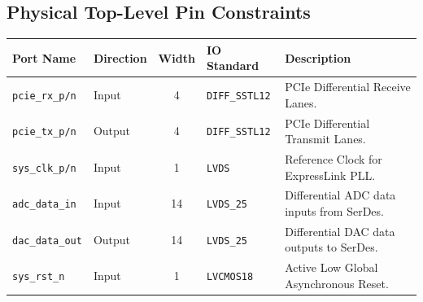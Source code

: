 \subsection{Physical Top-Level Pin Constraints}
\noindent
\begin{tabularx}{\textwidth}{l l c l X}
\toprule
\textbf{Port Name} & \textbf{Direction} & \textbf{Width} & \textbf{IO Standard} & \textbf{Description} \\
\midrule
\texttt{pcie\_rx\_p/n} & Input & 4 & \texttt{DIFF\_SSTL12} & PCIe Differential Receive Lanes. \\
\texttt{pcie\_tx\_p/n} & Output & 4 & \texttt{DIFF\_SSTL12} & PCIe Differential Transmit Lanes. \\
\texttt{sys\_clk\_p/n} & Input & 1 & \texttt{LVDS} & Reference Clock for ExpressLink PLL. \\
\texttt{adc\_data\_in} & Input & 14 & \texttt{LVDS\_25} & Differential ADC data inputs from SerDes. \\
\texttt{dac\_data\_out} & Output & 14 & \texttt{LVDS\_25} & Differential DAC data outputs to SerDes. \\
\texttt{sys\_rst\_n} & Input & 1 & \texttt{LVCMOS18} & Active Low Global Asynchronous Reset. \\
\bottomrule
\end{tabularx}
